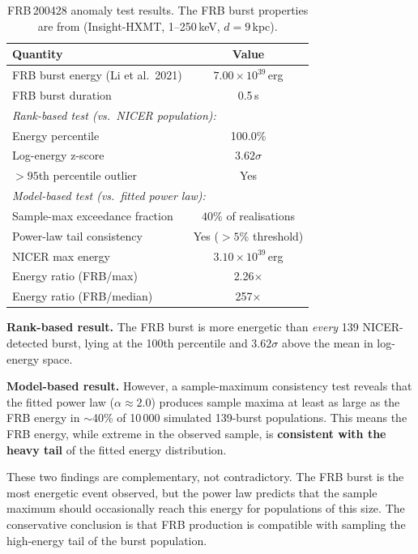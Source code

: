 \documentclass[12pt]{article}
\begin{document}
\begin{table}[H]
\centering
\caption{FRB\,200428 anomaly test results. The FRB burst properties
are from \citet{li2021} (Insight-HXMT, 1--250\,keV, $d = 9$\,kpc).}
\label{tab:frb}
\begin{tabular}{@{}lc@{}}
\toprule
Quantity & Value \\
\midrule
FRB burst energy (Li et al.\ 2021) & $7.00 \times 10^{39}$\,erg \\
FRB burst duration   & 0.5\,s \\
\midrule
\multicolumn{2}{l}{\textit{Rank-based test (vs.\ NICER population):}} \\
Energy percentile    & 100.0\% \\
Log-energy z-score   & $3.62\sigma$ \\
$>95$th percentile outlier & Yes \\
\midrule
\multicolumn{2}{l}{\textit{Model-based test (vs.\ fitted power law):}} \\
Sample-max exceedance fraction & $40\%$ of realisations \\
Power-law tail consistency & Yes ($> 5\%$ threshold) \\
\midrule
NICER max energy     & $3.10 \times 10^{39}$\,erg \\
Energy ratio (FRB/max)  & 2.26$\times$ \\
Energy ratio (FRB/median)  & 257$\times$ \\
\bottomrule
\end{tabular}
\end{table}

\textbf{Rank-based result.} The FRB burst is more energetic than
\textit{every} 139 NICER-detected burst, lying at the 100th percentile
and $3.62\sigma$ above the mean in log-energy space.

\textbf{Model-based result.} However, a sample-maximum consistency test
reveals that the fitted power law ($\alpha \approx 2.0$) produces
sample maxima at least as large as the FRB energy in $\sim$40\% of
10\,000 simulated 139-burst populations. This means the FRB energy,
while extreme in the observed sample, is \textbf{consistent with the
heavy tail} of the fitted energy distribution.

These two findings are complementary, not contradictory. The FRB burst
is the most energetic event observed, but the power law predicts that
the sample maximum should occasionally reach this energy for populations
of this size. The conservative conclusion is that FRB production is
compatible with sampling the high-energy tail of the burst population.
\end{document}
